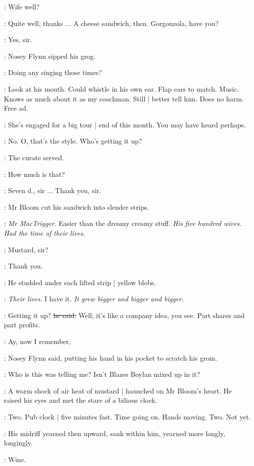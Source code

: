 \nosey:
Wife well?

\Bloom:
Quite well,
thanks ...
A cheese sandwich, then.
Gorgonzola,
have you?

\curate:
Yes, sir.

:
Nosey Flynn sipped his grog.

\nosey:
Doing any singing those times?

\BloomInt:
Look at his mouth.
Could whistle in his own ear.
Flap ears to match.
Music.
Knows as much about it as my coachman.
Still |
better tell him.
Does no harm.
Free ad.

\Bloom:
She's engaged for a big tour |
end of this month.
You may have heard perhaps.

\nosey:
No.
O, that's the style.
Who's getting it up?

:
The curate served.

\Bloom:
How much is that?

\curate:
Seven d., sir ...
Thank you, sir.

:
Mr Bloom cut his sandwich into slender strips.

\BloomInt:
\emph{Mr MacTrigger.}
Easier than the dreamy creamy stuff.
\emph{His five hundred wives.
Had the time of their lives.}

\curate:
Mustard, sir?

\Bloom:
Thank you.

:
He studded under each lifted strip |
yellow blobs.

\BloomInt:
\emph{Their lives.}
I have it.
\emph{It grew bigger and bigger and bigger.}

\Bloom:
Getting it up?
\sout{he said.}
Well, it's like a company idea, you see.
Part shares and part profits.

\nosey:
Ay, now I remember,

:
Nosey Flynn said,
putting his hand in his pocket to scratch his groin.

\nosey:
Who is this was telling me?
Isn't Blazes Boylan mixed up in it?

:
A warm shock of air heat of mustard |
haunched on Mr Bloom's heart.
He raised his eyes and met the stare of a bilious clock.

\BloomInt:
Two.
Pub clock |
five minutes fast.
Time going on.
Hands moving.
Two.
Not yet.

:
His midriff yearned then upward,
sank within him,
yearned more longly,
longingly.

\BloomInt:
Wine.

